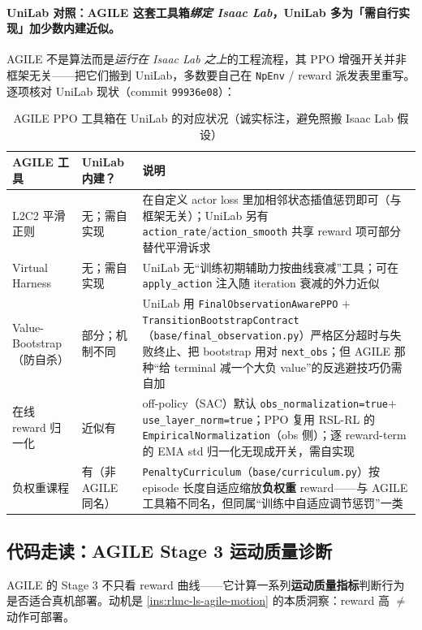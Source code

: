 \paragraph{UniLab 对照：AGILE 这套工具箱\emph{绑定 Isaac Lab}，UniLab 多为「需自行实现」加少数内建近似。}AGILE 不是算法而是\emph{运行在 Isaac Lab 之上}的工程流程，其 PPO 增强开关并非框架无关——把它们搬到 UniLab，多数要自己在 \verb|NpEnv| / reward 派发表里重写。逐项核对 UniLab 现状（commit \texttt{99936e08}）：

\begin{table}[H]\centering\small
\caption{AGILE PPO 工具箱在 UniLab 的对应状况（诚实标注，避免照搬 Isaac Lab 假设）}
\label{tab:rlmc-ls-agile-unilab}
\begin{tabular}{@{}p{3.4cm}p{3.0cm}p{6.0cm}@{}}
\toprule
AGILE 工具 & UniLab 内建？ & 说明 \\
\midrule
L2C2 平滑正则 & 无；需自实现 & 在自定义 actor loss 里加相邻状态插值惩罚即可（与框架无关）；UniLab 另有 \verb|action_rate|/\verb|action_smooth| 共享 reward 项可部分替代平滑诉求 \\
Virtual Harness & 无；需自实现 & UniLab 无“训练初期辅助力按曲线衰减”工具；可在 \verb|apply_action| 注入随 iteration 衰减的外力近似 \\
Value-Bootstrap（防自杀） & 部分；机制不同 & UniLab 用 \verb|FinalObservationAwarePPO| $+$ \verb|TransitionBootstrapContract|（\verb|base/final_observation.py|）严格区分超时与失败终止、把 bootstrap 用对 \verb|next_obs|；但 AGILE 那种“给 terminal 减一个大负 value”的反逃避技巧仍需自加 \\
在线 reward 归一化 & 近似有 & off-policy（SAC）默认 \verb|obs_normalization=true|$+$\verb|use_layer_norm=true|；PPO 复用 RSL-RL 的 \verb|EmpiricalNormalization|（obs 侧）；逐 reward-term 的 EMA std 归一化无现成开关，需自实现 \\
负权重课程 & 有（非 AGILE 同名） & \verb|PenaltyCurriculum|（\verb|base/curriculum.py|）按 episode 长度自适应缩放\textbf{负权重} reward——与 AGILE 工具箱不同名，但同属“训练中自适应调节惩罚”一类 \\
\bottomrule
\end{tabular}
\end{table}

\subsection{代码走读：AGILE Stage 3 运动质量诊断}
\label{sec:rlmc-ls-agile-motion}

AGILE 的 Stage 3 不只看 reward 曲线——它计算一系列\textbf{运动质量指标}判断行为是否适合真机部署。动机是 \cref{ins:rlmc-ls-agile-motion} 的本质洞察：reward 高 $\ne$ 动作可部署。

